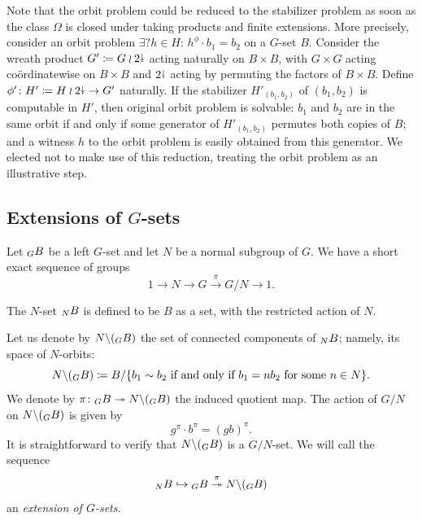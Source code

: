 \documentclass{amsart}
\begin{document}
Note that the orbit problem could be reduced to the stabilizer problem
as soon as the class $\Omega$ is closed under taking products and
finite extensions. More precisely, consider an orbit problem $\exists?
h\in H:\,h^\phi\cdot b_1=b_2$ on a $G$-set $B$. Consider the wreath
product $G'\coloneqq G\wr2{\stackrel{\downarrow}{\smash.}}$ acting naturally on $B\times B$, with
$G\times G$ acting co\"ordinatewise on $B\times B$ and $2{\stackrel{\downarrow}{\smash.}}$ acting
by permuting the factors of $B\times B$. Define $\phi'\colon
H'\coloneqq H\wr2{\stackrel{\downarrow}{\smash.}}\to G'$ naturally. If the stabilizer
$H'_{(b_1,b_2)}$ of $(b_1,b_2)$ is computable in $H'$, then original
orbit problem is solvable: $b_1$ and $b_2$ are in the same orbit if
and only if some generator of $H'_{(b_1,b_2)}$ permutes both copies of
$B$; and a witness $h$ to the orbit problem is easily obtained from
this generator. We elected not to make use of this reduction, treating
the orbit problem as an illustrative step.

\subsection{Extensions of \boldmath $G$-sets}
Let $\subscript G B$ be a left $G$-set and let $N$ be a normal subgroup of
$G$. We have a short exact sequence of groups
\begin{equation}
\label{eq:ExtOfGr} 1\longrightarrow N\longrightarrow G \overset\pi\longrightarrow G/N\longrightarrow 1.
\end{equation}

The $N$-set $\subscript NB$ is defined to be $B$ as a set, with the
restricted action of $N$.

Let us denote by $N\backslash(\subscript G B)$ the set of connected
components of $\subscript NB$; namely, its space of $N$-orbits:
\[N\backslash(\subscript G B)\coloneqq B/\{b_1\sim b_2 \text{ if and only if $b_1=n b_2$ for some
}n\in N\}.
\]
We denote by
$\pi\colon\subscript G B \twoheadrightarrow N\backslash(\subscript G
B)$ the induced quotient map. The action of $G/N$ on
$N\backslash(\subscript G B)$ is given by
\[g^\pi\cdot b^\pi=(g b)^\pi.
\]
It is straightforward to verify that $N\backslash(\subscript G B)$ is
a $G/N$-set.  We will call the sequence
\begin{equation}\label{eq:ExtOfG_Sets}
  \subscript NB\hookrightarrow\subscript G B\overset\pi\twoheadrightarrow N\backslash(\subscript G B)
\end{equation}
an \textit{extension of $G$-sets}.
\end{document}
